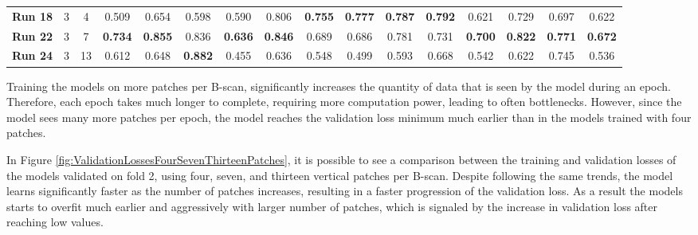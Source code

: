 \begin{table}[!ht]
{\begin{tabular}{|c|c|c|ccc|ccc|ccc|c|c|c|c|}
		\hline
		\hline
		
		\textbf{Run 18} & 3 & 4 & \multicolumn{1}{c|}{0.509} & \multicolumn{1}{c|}{0.654} & 0.598 & \multicolumn{1}{c|}{0.590} & \multicolumn{1}{c|}{0.806} & \textbf{0.755} & \multicolumn{1}{c|}{\textbf{0.777}} & \multicolumn{1}{c|}{\textbf{0.787}} & \textbf{0.792} & 0.621 & 0.729 & 0.697 & 0.622 \\
		
		\textbf{Run 22} & 3 & 7 & \multicolumn{1}{c|}{\textbf{0.734}} & \multicolumn{1}{c|}{\textbf{0.855}} & 0.836 & \multicolumn{1}{c|}{\textbf{0.636}} & \multicolumn{1}{c|}{\textbf{0.846}} & 0.689 & \multicolumn{1}{c|}{0.686} & \multicolumn{1}{c|}{0.781} & 0.731 & \textbf{0.700} & \textbf{0.822} & \textbf{0.771} & \textbf{0.672} \\
		
		\textbf{Run 24} & 3 & 13 & \multicolumn{1}{c|}{0.612} & \multicolumn{1}{c|}{0.648} & \textbf{0.882} & \multicolumn{1}{c|}{0.455} & \multicolumn{1}{c|}{0.636} & 0.548 & \multicolumn{1}{c|}{0.499} & \multicolumn{1}{c|}{0.593} & 0.668 & 0.542 & 0.622 & 0.745 & 0.536 \\
		
		\hline
			
	\end{tabular}}
	\label{tab:Experiment1.3SevenVsThirteenPatches}
\end{table}

Training the models on more patches per B-scan, significantly increases the quantity of data that is seen by the model during an epoch. Therefore, each epoch takes much longer to complete, requiring more computation power, leading to often bottlenecks. However, since the model sees many more patches per epoch, the model reaches the validation loss minimum much earlier than in the models trained with four patches. 
\par
In Figure \ref{fig:ValidationLossesFourSevenThirteenPatches}, it is possible to see a comparison between the training and validation losses of the models validated on fold 2, using four, seven, and thirteen vertical patches per B-scan. Despite following the same trends, the model learns significantly faster as the number of patches increases, resulting in a faster progression of the validation loss. As a result the models starts to overfit much earlier and aggressively with larger number of patches, which is signaled by the increase in validation loss after reaching low values.

